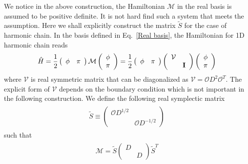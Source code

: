 We notice in the above construction, the Hamiltonian $\mathcal{M}$ in the real basis is assumed to be positive definite. It is not hard find such a system that meets the assumption. Here we shall explicitly construct the matrix $\tilde{S}$ for the case of harmonic chain. In the basis defined in Eq.~\eqref{Real basis}, the Hamiltonian for 1D harmonic chain reads
\begin{eqnarray}\begin{aligned}
\hat{H}
=\frac{1}{2}
\left(\begin{array}{ccc}
\phi & \pi
\end{array}\right)
\mathcal{M}
\left(\begin{array}{ccc}
\phi\\
\pi
\end{array}\right)
=\frac{1}{2}
\left(\begin{array}{ccc}
\phi & \pi
\end{array}\right)
\left(\begin{array}{ccc}
\mathcal{V} \\
& {\bf I}
\end{array}\right)
\left(\begin{array}{ccc}
\phi\\
\pi
\end{array}\right)
\end{aligned}\end{eqnarray}
where $\mathcal{V}$ is real symmetric matrix that can be diagonalized as $\mathcal{V}=\mathcal{O}D^2\mathcal{O}^T$. The explicit form of $\mathcal{V}$ depends on the boundary condition which is not important in the following construction. We define the following real symplectic matrix
\begin{eqnarray}\begin{aligned}
\tilde{S}\equiv\left(\begin{array}{ccc}
\mathcal{O}D^{1/2} \\
& \mathcal{O}D^{-1/2}
\end{array}\right)
\end{aligned}\end{eqnarray}
such that 
\begin{eqnarray}\begin{aligned}
\mathcal{M}=\tilde{S}\left(\begin{array}{ccc}
D \\ 
& D
\end{array}\right)
\tilde{S}^T
\end{aligned}\end{eqnarray}
